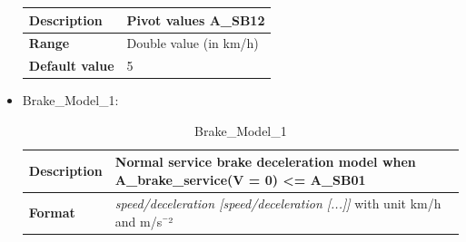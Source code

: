 \begin{itemize}
\begin{longtable}{|l|l|}
		\begin{minipage}[t]{0.22\linewidth} \textbf{Description}	\end{minipage}
		&	\begin{minipage}[t]{0.78\linewidth} Pivot values A\_SB12 \end{minipage} \\
		
		\hline
		
		\begin{minipage}[t]{0.22\linewidth} \textbf{Range} \end{minipage}
		&	\begin{minipage}[t]{0.78\linewidth} Double value (in km/h) \end{minipage} \\
		
		\hline
		
		\begin{minipage}[t]{0.22\linewidth} \textbf{Default value}	\end{minipage}
		&	\begin{minipage}[t]{0.78\linewidth} 5 \end{minipage} \\
		
		\hline
	\end{longtable}
	
	\item Brake\_Model\_1:
	\begin{longtable}{|l|l|}
		\caption{Brake\_Model\_1}\\
		\hline
		
		\begin{minipage}[t]{0.22\linewidth} \textbf{Description}	\end{minipage}
		&	\begin{minipage}[t]{0.78\linewidth} Normal service brake deceleration model when A\_brake\_service(V = 0) <= A\_SB01 \end{minipage} \\
		
		\hline
		
		\begin{minipage}[t]{0.22\linewidth} \textbf{Format}	\end{minipage}
		&	\begin{minipage}[t]{0.78\linewidth} \textit{speed/deceleration [speed/deceleration [...]]}  with unit km/h and m/s¯²\end{minipage} \\
		
		\hline
		

\end{longtable}
\end{itemize}
